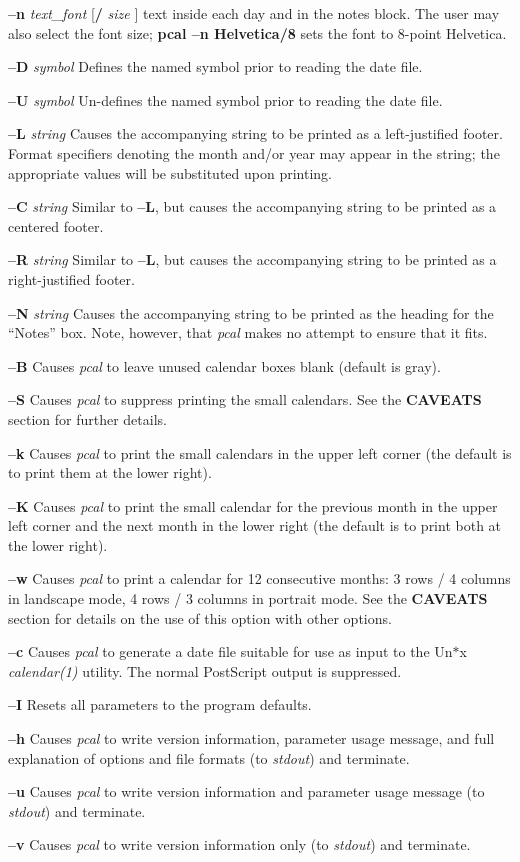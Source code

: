 \begin{TPlist}{{\bf --n} {\it text\_font} [{\bf /} {\it size} ]}
text inside each day and in the notes block.  The user may also select
the font size;  {\bf pcal --n Helvetica/8} sets the font to 8-point
Helvetica.
\item[{{\bf --D} {\it symbol}}]
Defines the named symbol prior to reading the date file.
\item[{{\bf --U} {\it symbol}}]
Un-defines the named symbol prior to reading the date file.
\item[{{\bf --L} {\it string}}]
Causes the accompanying string to be printed as a left-justified footer.
Format specifiers denoting the month and/or year may appear in the
string;  the appropriate values will be substituted upon printing.
\item[{{\bf --C} {\it string}}]
Similar to {\bf --L}, but causes the accompanying string to be printed as
a centered footer.
\item[{{\bf --R} {\it string}}]
Similar to {\bf --L}, but causes the accompanying string to be printed as
a right-justified footer.
\item[{{\bf --N} {\it string}}]
Causes the accompanying string to be printed as the heading for the
``Notes'' box.  Note, however, that {\it pcal} makes no attempt to ensure
that it fits.
\item[{{\bf --B}}]
Causes {\it pcal} to leave unused calendar boxes blank (default is gray).
\item[{{\bf --S}}]
Causes {\it pcal} to suppress printing the small calendars.  See the {\bf
CAVEATS} section for further details.
\item[{{\bf --k}}]
Causes {\it pcal} to print the small calendars in the upper left corner
(the default is to print them at the lower right).
\item[{{\bf --K}}]
Causes {\it pcal} to print the small calendar for the previous month in
the upper left corner and the next month in the lower right (the default
is to print both at the lower right).
\item[{{\bf --w}}]
Causes {\it pcal} to print a calendar for 12 consecutive months: 3 rows /
4 columns in landscape mode, 4 rows / 3 columns in portrait mode.  See
the {\bf CAVEATS} section for details on the use of this option with
other options.
\item[{{\bf --c}}]
Causes {\it pcal} to generate a date file suitable for use as input to
the Un$\ast$x {\it calendar(1)} utility.  The normal PostScript output is
suppressed.
\item[{{\bf --I}}]
Resets all parameters to the program defaults.
\item[{{\bf --h}}]
Causes {\it pcal} to write version information, parameter usage message,
and full explanation of options and file formats (to {\it stdout}) and
terminate.
\item[{{\bf --u}}]
Causes {\it pcal} to write version information and parameter usage
message (to {\it stdout}) and terminate.
\item[{{\bf --v}}]
Causes {\it pcal} to write version information only (to {\it stdout}) and
terminate.
\end{TPlist}

